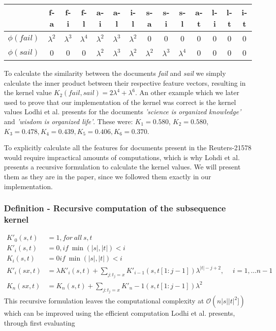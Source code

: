 \vspace{10pt}
\begin{centering}
\begin{tabular}{|c|c|c|c|c|c|c|c|c|c|c|c|c|c|}
	\hline 
	& f-a & f-i & f-l & a-i & a-l & i-l & s-a & s-i & s-l & a-t & l-i & l-t & i-t \\ 
	\hline 
	$\phi(fail)$ & $ \lambda^2 $ & $ \lambda^3 $ &$ \lambda^4 $  &  $ \lambda^2 $& $ \lambda^3 $  & $ \lambda^2 $ & 0 & 0 & 0 & 0 & 0 & 0 & 0 \\ 
	\hline 
	$\phi(sail)$ & 0 & 0 & 0 & $\lambda^2$ & $\lambda^3$ & $\lambda^2$ & $\lambda^2$ & $\lambda^3$ & $\lambda^4$ & 0 & 0 & 0 & 0 \\ 
	\hline 

\end{tabular} 
\end{centering}

\vspace{10pt}
To calculate the similarity between the documents \textit{fail} and \textit{sail} we simply calculate the inner product between their respective feature vectors, resulting in the kernel value $ K_2(fail,sail)  = 2\lambda^4 + \lambda^6 $. An other example which we later used to prove that our implementation of the kernel was correct is the kernel values Lodhi et al. presents for the documents \textit{'science is organized knowledge'} and \textit{'wisdom is organized life'}. These were: $ K_1 = 0.580 $, $ K_2 = 0.580$, $ K_3 = 0.478, K_4=0.439, K_5 = 0.406, K_6 = 0.370 $.

To explicitly calculate all the features for documents present in the Reuters-21578 would require impractical amounts of computations, which is why Lohdi et al. presents a recursive formulation to calculate the kernel values. We will present them as they are in the paper, since we followed them exactly in our implementation. 

\subsubsection*{Definition - Recursive computation of the subsequence kernel}
\begin{align*}
	K'_{0}(s,t) & = 1, for\ all\ s,t \\
	K'_i(s,t) & = 0, if\ \min(|s|,|t|) < i \\
	K_i(s,t) & = 0 if\ \min(|s|,|t|) < i \\
	K'_i(sx,t) & = \lambda K'_i(s,t) + \sum_{j:t_j=x} K'_{i-1}(s,t[1:j-1])\lambda^{|t|-j+2}, \hspace{15pt} i = 1, \dots n-1 \\	
	K_{n}(sx,t) & = K_n(s,t) + \sum_{j:t_j = x}K'_n-1(s,t[1:j-1])\lambda^2
\end{align*}  
This recursive formulation leaves the computational complexity at $ \mathcal{O}(n|s||t|^2]) $ which can be improved using the efficient computation Lodhi et al. presents, through first evaluating

